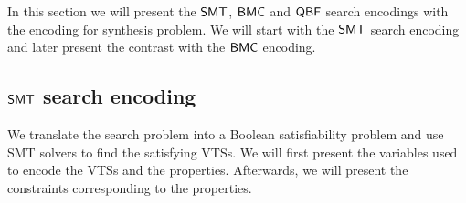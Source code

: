 %
%
%

In this section we will present the $\mathsf{SMT}$, $\mathsf{BMC}$ and $\mathsf{QBF}$ search encodings with the encoding for synthesis problem. We will start with the $\mathsf{SMT}$ search encoding and later present the contrast with the $\mathsf{BMC}$ encoding.

\subsection{$\mathsf{SMT}$ search encoding}
\label{enc:smt}


We translate the search problem into a Boolean satisfiability
problem and use SMT solvers to find the satisfying VTSs.
%
We will first present the variables used to encode the
VTSs and the properties.
%
Afterwards, we will present the constraints corresponding to the
properties.

